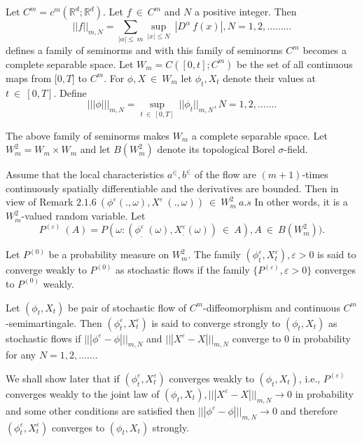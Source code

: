 Let $C^m = c^m(\mathbb{R}^d; \mathbb{R}^d)$. Let $f ~ \in ~ C^m$ and $N$ a
positive integer. Then 
$$
|| f ||_{m,N} = \sum_{|\alpha | \le ~ m} \sup_{|x|\le N} ~ |D^\alpha ~
f(x) |, N = 1,2,\ldots \ldots \ldots 
$$
defines a family of seminorms and with this family of seminorms $C^m$
becomes a complete separable space. Let $W_m = C([0,t]; C^m)$ be the
set of all continuous maps from [$0,T$] to $C^m$. For $\phi, X ~
\in ~ W_m$ let $\phi_t, X_t$ denote their values at $t ~
\in ~ [0,T]$. Define 
$$
||| \phi |||_{m,N} = \sup_{t ~ \in ~ [0,T]} ~ || \phi_t
||_{m,N}, N = 1,2, \ldots \ldots.   
$$

The above family of seminorms makes $W_m$ a complete separable
space. Let $W^2_m = W_m \times W_m$ and let $B(W^2_m)$ denote its
topological Borel $\sigma$-field. 

Assume that the local characteristics $a^\in,  b^\in $
of the flow are $(m+1)$-times continuously spatially differentiable
and the derivatives are boun\-ded. Then in view of Remark $2.1.6 ~
(\phi^\varepsilon (.,  \omega),X^\varepsilon ~ (.,\omega)) ~
\in ~W^2_m ~a.s$  In other words, it is a $W^2_m$-valued
random variable. Let 
$$
P^{(\varepsilon)} ~(A) = P(\omega:  (\phi^\varepsilon_. ~ 
(\omega),X^\varepsilon_. (\omega)) ~ \in ~ A), A ~ \in
~ B(W^2_m)). 
$$


\begin{definition}\label{c3:def3.1.1}%
  Let $P^{(0)}$ be a probability measure on $W^2_m$. The family
  $(\phi^\varepsilon_t,X^\varepsilon_t), \varepsilon > 0$ is said to
  converge weakly to $P^{(0)}$ as stochastic flows if the family $\{
  P^{(\varepsilon)}, \varepsilon > 0 \}$ converges to $P^{(0)}$
  weakly. 
\end{definition}

\begin{definition}\label{c3:def3.1.2}\pageoriginale%
  Let $(\phi_t,X_t)$ be pair of stochastic flow of
  $C^m$-diffeomor\-phism and continuous $C^m$-semimartingale. Then
  $(\phi^\varepsilon_t,X^\varepsilon_t)$ is said to converge strongly
  to $(\phi_t,X_t)$ as stochastic flows if $||| \phi^\varepsilon -
  \phi |||_{m,N}$ and $||| X^{\varepsilon} - X |||_{m,N}$ converge to
  0 in probability for any $N =   1,2,\ldots \ldots$. 
\end{definition}

\setcounter{remark}{2}
\begin{remark}\label{c3:rem3.1.3}%
  We shall show later that if $(\phi^\varepsilon_t, X^\varepsilon_t)$
  converges weakly to $(\phi_t,X_t)$, i.e.,  $P^{(\varepsilon)}$
  converges weakly to the joint law of $(\phi_t, X_t), |||
  X^\varepsilon - X |||_{m,N} \rightarrow 0$ in probability and some
  other conditions are satisfied then $||| \phi^\varepsilon - \phi
  |||_{m,N}\rightarrow 0$ and therefore
  $(\phi^\varepsilon_t,X^\varepsilon_t)$ converges to $(\phi_t,X_t)$
  strongly. 
\end{remark}

